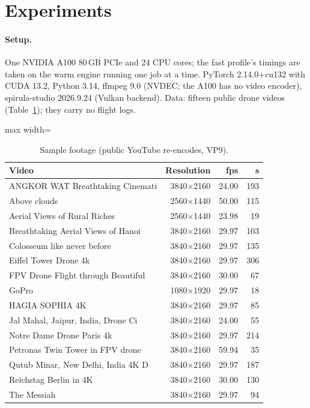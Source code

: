 \section{Experiments}\label{sec:exp}

\paragraph{Setup.} One NVIDIA A100 80\,GB PCIe and 24 CPU cores; the fast profile's timings are taken on the warm engine running one job at a time. PyTorch 2.14.0+cu132 with CUDA 13.2, Python 3.14, ffmpeg 9.0 (NVDEC; the A100 has no video encoder), spirula-studio 2026.9.24 (Vulkan backend). Data: fifteen public drone videos (Table~\ref{tab:data}); they carry no flight logs.

\begin{table}[htbp]
\centering\small
\caption{Sample footage (public YouTube re-encodes, VP9).}\label{tab:data}
\begin{adjustbox}{max width=\linewidth}
\begin{tabular}{lrrr}
\toprule
Video & Resolution & fps & s \\
\midrule
ANGKOR WAT Breathtaking  Cinemati & 3840$\times$2160 & 24.00 & 193 \\
Above clouds & 2560$\times$1440 & 50.00 & 115 \\
Aerial Views of Rural Riches & 2560$\times$1440 & 23.98 & 19 \\
Breathtaking Aerial Views of Hanoi & 3840$\times$2160 & 29.97 & 103 \\
Colosseum like never before & 3840$\times$2160 & 29.97 & 135 \\
Eiffel Tower Drone 4k & 3840$\times$2160 & 29.97 & 306 \\
FPV Drone Flight through Beautiful & 3840$\times$2160 & 30.00 & 67 \\
GoPro & 1080$\times$1920 & 29.97 & 18 \\
HAGIA SOPHIA 4K & 3840$\times$2160 & 29.97 & 85 \\
Jal Mahal, Jaipur, India, Drone Ci & 3840$\times$2160 & 24.00 & 55 \\
Notre Dame Drone Paris 4k & 3840$\times$2160 & 29.97 & 214 \\
Petronas Twin Tower in FPV drone & 3840$\times$2160 & 59.94 & 35 \\
Qutub Minar, New Delhi, India 4K D & 3840$\times$2160 & 29.97 & 187 \\
Reichstag Berlin  in 4K & 3840$\times$2160 & 30.00 & 130 \\
The Messiah & 3840$\times$2160 & 29.97 & 94 \\
\bottomrule
\end{tabular}
\end{adjustbox}
\end{table}

